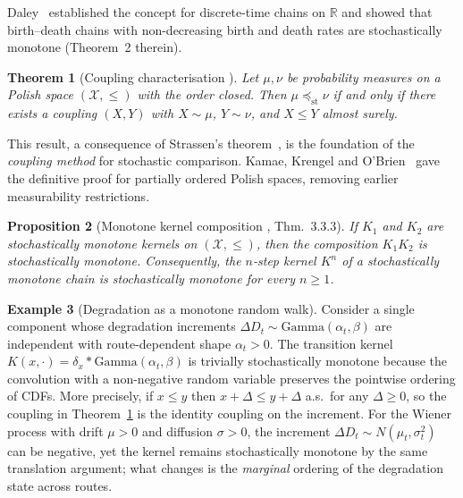\documentclass[11pt,a4paper]{article}
\theoremstyle{plain}
\newtheorem{theorem}{Theorem}[section]
\newtheorem{proposition}[theorem]{Proposition}
\theoremstyle{definition}
\newtheorem{example}[theorem]{Example}
\theoremstyle{remark}
\begin{document}
Daley~\cite{daley1968} established the concept for discrete-time chains on
$\mathbb{R}$ and showed that birth--death chains with non-decreasing birth and
death rates are stochastically monotone (Theorem~2 therein).

\begin{theorem}[Coupling characterisation {\cite{kamae1977}}]
\label{thm:strassen}
Let $\mu, \nu$ be probability measures on a Polish space
$(\mathcal{X}, \leq)$ with the order closed. Then
$\mu \preceq_{\mathrm{st}} \nu$ if and only if there exists a coupling
$(X,Y)$ with $X \sim \mu$, $Y \sim \nu$, and $X \leq Y$ almost surely.
\end{theorem}

This result, a consequence of Strassen's theorem~\cite{strassen1965}, is the
foundation of the \emph{coupling method} for stochastic comparison.
Kamae, Krengel and O'Brien~\cite{kamae1977} gave the definitive
proof for partially ordered Polish spaces, removing earlier measurability
restrictions.

\begin{proposition}[Monotone kernel composition {\cite{muller2002}, Thm.~3.3.3}]
\label{prop:kernel_comp}
If $K_1$ and $K_2$ are stochastically monotone kernels on
$(\mathcal{X}, \leq)$, then the composition $K_1 K_2$ is stochastically monotone.
Consequently, the $n$-step kernel $K^n$ of a stochastically monotone chain is
stochastically monotone for every $n \geq 1$.
\end{proposition}

\begin{example}[Degradation as a monotone random walk]
\label{ex:gamma_monotone}
Consider a single component whose degradation increments
$\Delta D_t \sim \mathrm{Gamma}(\alpha_t, \beta)$ are independent with
route-dependent shape $\alpha_t > 0$.  The transition kernel
$K(x, \cdot) = \delta_x * \mathrm{Gamma}(\alpha_t, \beta)$ is trivially stochastically
monotone because the convolution with a non-negative random variable preserves the
pointwise ordering of CDFs.  More precisely, if $x \leq y$ then
$x + \Delta \leq y + \Delta$ a.s.\ for any $\Delta \geq 0$, so the coupling in
Theorem~\ref{thm:strassen} is the identity coupling on the increment.
For the Wiener process with drift $\mu > 0$ and diffusion $\sigma > 0$, the increment
$\Delta D_t \sim N(\mu_t, \sigma_t^2)$ can be negative, yet the kernel remains
stochastically monotone by the same translation argument; what changes is the
\emph{marginal} ordering of the degradation state across routes.
\end{example}
\end{document}
